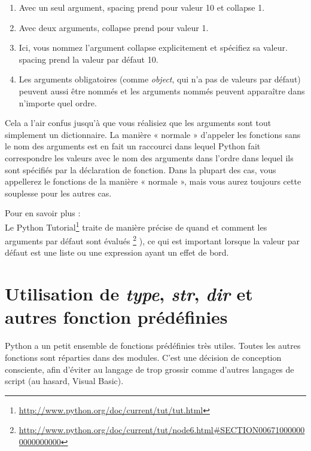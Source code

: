 \begin{enumerate}
    \item{Avec un seul argument, spacing prend pour valeur 10 et collapse 1.}
    \item{Avec deux arguments, collapse prend pour valeur 1.}
    \item{Ici, vous nommez l’argument collapse explicitement et spécifiez sa valeur. spacing prend la valeur par défaut 10.}
    \item{Les arguments obligatoires (comme \emph{object}, qui n’a pas de valeurs par défaut) peuvent aussi être nommés et les arguments nommés peuvent apparaître dans n’importe quel ordre.}
\end{enumerate}

Cela a l’air confus jusqu’à que vous réalisiez que les arguments sont tout simplement un dictionnaire. La manière « normale » d’appeler les fonctions sans le nom des arguments est en fait un raccourci dans lequel Python fait correspondre les valeurs avec le nom des arguments dans l’ordre dans lequel ils sont spécifiés par la déclaration de fonction. Dans la plupart des cas, vous appellerez le fonctions de la manière « normale », mais vous aurez toujours cette souplesse pour les autres cas.


\noindent Pour en savoir plus : \\
Le Python Tutorial\footnote{\url{http://www.python.org/doc/current/tut/tut.html}} traite de manière précise de quand et comment les arguments par défaut sont évalués \footnote{\url{http://www.python.org/doc/current/tut/node6.html\#SECTION006710000000000000000}} ), ce qui est important lorsque la valeur par défaut est une liste ou une expression ayant un effet de bord.

\section{Utilisation de \emph{type}, \emph{str}, \emph{dir} et autres fonction prédéfinies}

Python a un petit ensemble de fonctions prédéfinies très utiles. Toutes les autres fonctions sont réparties dans des modules. C’est une décision de conception consciente, afin d’éviter au langage de trop grossir comme d’autres langages de script (au hasard, Visual Basic).

